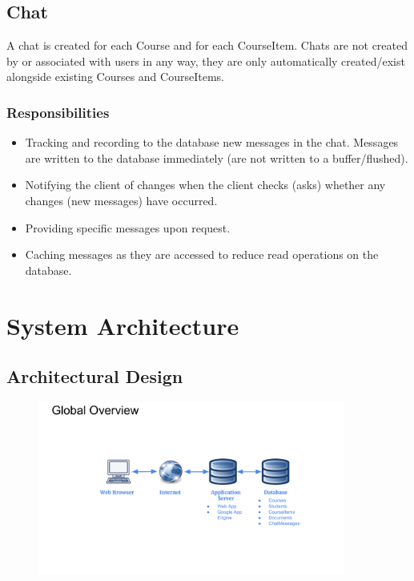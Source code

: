\documentclass{scrreprt}
\begin{document}
\section{Chat}
A chat is created for each Course and for each CourseItem. Chats are not created by or associated with users in any way, they are only automatically created/exist alongside existing Courses and CourseItems.
\subsection{Responsibilities}
\begin{itemize}
	\item Tracking and recording to the database new messages in the chat. Messages are written to the database immediately (are not written to a buffer/flushed).
	\item Notifying the client of changes when the client checks (asks) whether any changes (new messages) have occurred.
	\item Providing specific messages upon request.
	\item Caching messages as they are accessed to reduce read operations on the database.
\end{itemize}


\chapter{System Architecture}

\section{Architectural Design}

\begin{figure}[ht]
  \centering
  \includegraphics[page=1,width=0.9\textwidth]{diagrams/SDD_Diagrams.pdf}
  \label{fig:SDD_1}
\end{figure}
\end{document}
